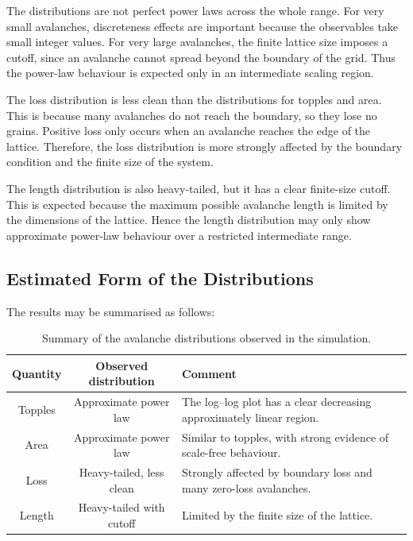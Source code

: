 The distributions are not perfect power laws across the whole range. For very small
avalanches, discreteness effects are important because the observables take small integer
values. For very large avalanches, the finite lattice size imposes a cutoff, since an avalanche
cannot spread beyond the boundary of the grid. Thus the power-law behaviour is expected
only in an intermediate scaling region.

The loss distribution is less clean than the distributions for topples and area. This is because
many avalanches do not reach the boundary, so they lose no grains. Positive loss only occurs
when an avalanche reaches the edge of the lattice. Therefore, the loss distribution is more
strongly affected by the boundary condition and the finite size of the system.

The length distribution is also heavy-tailed, but it has a clear finite-size cutoff. This is
expected because the maximum possible avalanche length is limited by the dimensions of
the lattice. Hence the length distribution may only show approximate power-law behaviour
over a restricted intermediate range.

\subsection{Estimated Form of the Distributions}

The results may be summarised as follows:

\begin{table}[htbp]
    \centering
    \begin{tabular}{c|c|p{}}
        \hline
        Quantity & Observed distribution & Comment \\
        \hline
        Topples & Approximate power law & The log--log plot has a clear decreasing approximately linear region. \\
        Area & Approximate power law & Similar to topples, with strong evidence of scale-free behaviour. \\
        Loss & Heavy-tailed, less clean & Strongly affected by boundary loss and many zero-loss avalanches. \\
        Length & Heavy-tailed with cutoff & Limited by the finite size of the lattice. \\
        \hline
    \end{tabular}
    \caption{Summary of the avalanche distributions observed in the simulation.}
    \label{tab:q7_distribution_summary}
\end{table}

